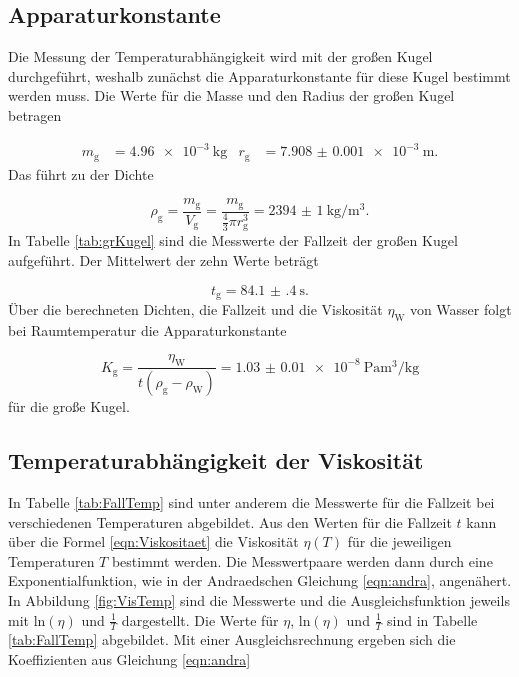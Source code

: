 \subsection{Apparaturkonstante}

Die Messung der Temperaturabhängigkeit wird mit der großen Kugel durchgeführt,
weshalb zunächst die Apparaturkonstante für diese Kugel bestimmt werden muss.
Die Werte für die Masse und den Radius der großen Kugel betragen

\begin{align}
  m_\text{g} & = \SI{4.96e-3}{\kilo\gram} & r_\text{g} & =
  \SI{7.908(1)e-3}{\meter}.
\end{align}
Das führt zu der Dichte

\begin{equation}
  \rho_\text{g} = \frac{m_\text{g}}{V_\text{g}} = \frac{m_\text{g}}
  {\frac{4}{3}\pi r_\text{g}^3} = \SI{2394(1)}{\kilo\gram\per\cubic\meter}.
  \label{eqn:rhog}
\end{equation}
In Tabelle \ref{tab:grKugel} sind die Messwerte der Fallzeit der großen
Kugel aufgeführt. Der Mittelwert der zehn Werte beträgt

\begin{equation}
  t_\text{g} = \SI{84.1(4)}{\second}.
\end{equation}
Über die berechneten Dichten, die Fallzeit und die Viskosität $\eta_\text{W}$
von Wasser folgt bei Raumtemperatur die Apparaturkonstante

\begin{equation}
  K_\text{g} = \frac{\eta_\text{W}}{t(\rho_\text{g}-\rho_\text{W})}
  = \SI{1.03(1)e-8}{\pascal\cubic\meter\per\kilo\gram}
\end{equation}
für die große Kugel.

\subsection{Temperaturabhängigkeit der Viskosität}

In Tabelle \ref{tab:FallTemp} sind unter anderem die Messwerte für die Fallzeit
bei verschiedenen Temperaturen abgebildet.
Aus den Werten für die Fallzeit $t$ kann über die Formel \eqref{eqn:Viskositaet}
die Viskosität $\eta(T)$ für die jeweiligen Temperaturen $T$ bestimmt werden.
Die Messwertpaare werden dann durch eine Exponentialfunktion, wie in der
Andraedschen Gleichung \eqref{eqn:andra}, angenähert.
In Abbildung \ref{fig:VisTemp} sind die Messwerte und die Ausgleichsfunktion
jeweils mit ln$(\eta)$ und $\frac{1}{T}$ dargestellt.
Die Werte für $\eta$, ln$(\eta)$ und $\frac{1}{T}$ sind in Tabelle
\ref{tab:FallTemp} abgebildet.
Mit einer Ausgleichsrechnung ergeben sich die Koeffizienten aus Gleichung
\eqref{eqn:andra}

